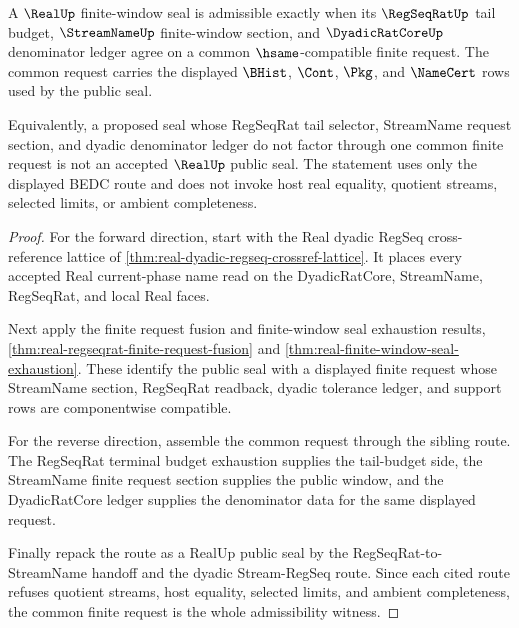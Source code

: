 \begin{theorem}
\label{thm:real-regseqrat-streamname-tightness}
A $\RealUp$ finite-window seal is admissible exactly when its $\RegSeqRatUp$ tail budget, $\StreamNameUp$ finite-window section, and $\DyadicRatCoreUp$ denominator ledger agree on a common $\hsame$-compatible finite request. The common request carries the displayed $\BHist$, $\Cont$, $\Pkg$, and $\NameCert$ rows used by the public seal.

Equivalently, a proposed seal whose RegSeqRat tail selector, StreamName request section, and dyadic denominator ledger do not factor through one common finite request is not an accepted $\RealUp$ public seal. The statement uses only the displayed BEDC route and does not invoke host real equality, quotient streams, selected limits, or ambient completeness.
\end{theorem}
\begin{proof}
For the forward direction, start with the Real dyadic RegSeq cross-reference lattice of \autoref{thm:real-dyadic-regseq-crossref-lattice}. It places every accepted Real current-phase name read on the DyadicRatCore, StreamName, RegSeqRat, and local Real faces.

Next apply the finite request fusion and finite-window seal exhaustion results, \autoref{thm:real-regseqrat-finite-request-fusion} and \autoref{thm:real-finite-window-seal-exhaustion}. These identify the public seal with a displayed finite request whose StreamName section, RegSeqRat readback, dyadic tolerance ledger, and support rows are componentwise compatible.

For the reverse direction, assemble the common request through the sibling route. The RegSeqRat terminal budget exhaustion supplies the tail-budget side, the StreamName finite request section supplies the public window, and the DyadicRatCore ledger supplies the denominator data for the same displayed request.

Finally repack the route as a RealUp public seal by the RegSeqRat-to-StreamName handoff and the dyadic Stream-RegSeq route. Since each cited route refuses quotient streams, host equality, selected limits, and ambient completeness, the common finite request is the whole admissibility witness.
\end{proof}

